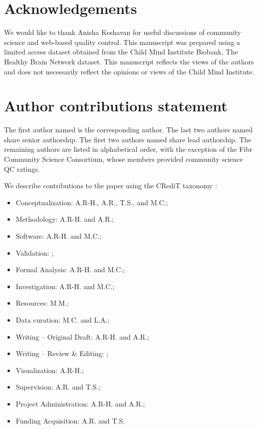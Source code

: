 \documentclass[fleqn,10pt]{wlscirep}
\begin{document}


\section*{Acknowledgements}

We would like to thank Anisha Keshavan for useful discussions of community
science and web-based quality control. This manuscript was prepared using a
limited access dataset obtained from the Child Mind Institute Biobank, The
Healthy Brain Network dataset. This manuscript reflects the views of the authors
and does not necessarily reflect the opinions or views of the Child Mind
Institute.

\section*{Author contributions statement}

The first author named is the corresponding author. The last two authors named
share senior authorship. The first two authors named share lead authorship. The
remaining authors are listed in alphabetical order, with the exception of
the Fibr Community Science Consortium, whose members provided community science
QC ratings.


We describe contributions to the paper using the CRediT taxonomy \cite{brand2015-vd,allen2014-oc}:
\begin{itemize}
    \item Conceptualization: A.R-H., A.R., T.S., and M.C.;
    \item Methodology: A.R-H. and A.R.;
    \item Software: A.R-H. and M.C.;
    \item Validation: ;
    \item Formal Analysis: A.R-H. and M.C.;
    \item Investigation: A.R-H. and M.C.;
    \item Resources: M.M.;
    \item Data curation: M.C. and L.A.;
    \item Writing – Original Draft: A.R-H. and A.R.;
    \item Writing – Review \& Editing: ;
    \item Visualization: A.R-H.;
    \item Supervision: A.R. and T.S.;
    \item Project Administration: A.R-H. and A.R.;
    \item Funding Acquisition: A.R. and T.S.
\end{itemize}
\end{document}
